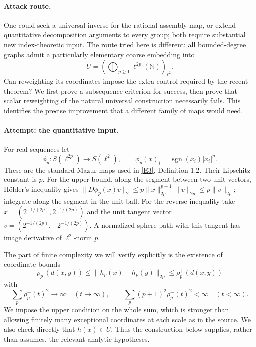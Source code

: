 \documentclass[11pt,a4paper]{article}
\newcommand{\N}{\mathbb{N}}
\newcommand{\eref}[2]{\hyperlink{extra:#1:#2}{[E#2]}}
\numberwithin{equation}{section}
\begin{document}
\paragraph{Attack route.}
One could seek a universal inverse for the rational assembly map, or extend quantitative decomposition arguments to every group; both require substantial new index-theoretic input. The route tried here is different: all bounded-degree graphs admit a particularly elementary coarse embedding into
\[
 U=\left(\bigoplus_{p\geq1}\ell^{2p}(\N)\right)_{\ell^2}.
\]
Can reweighting its coordinates impose the extra control required by the recent theorem? We first prove a subsequence criterion for success, then prove that scalar reweighting of the natural universal construction necessarily fails. This identifies the precise improvement that a different family of maps would need.

\paragraph{Attempt: the quantitative input.}
For real sequences let
\[
 \phi_p:S(\ell^{2p})\longrightarrow S(\ell^2),\qquad
 \phi_p(x)_i=\operatorname{sgn}(x_i)|x_i|^p.
\]
These are the standard Mazur maps used in \eref{statement}{3}, Definition 1.2. Their Lipschitz constant is $p$. For the upper bound, along the segment between two unit vectors, H\"older's inequality gives
$\|D\phi_p(x)v\|_2\leq p\|x\|_{2p}^{p-1}\|v\|_{2p}\leq p\|v\|_{2p}$; integrate along the segment in the unit ball. For the reverse inequality take
$x=(2^{-1/(2p)},2^{-1/(2p)})$ and the unit tangent vector
$v=(2^{-1/(2p)},-2^{-1/(2p)})$. A normalized sphere path with this tangent has image derivative of $\ell^2$-norm $p$.

The part of finite complexity we will verify explicitly is the existence of coordinate bounds
\begin{equation}\label{r56:bounds}
 \rho_p^-(d(x,y))\leq\|h_p(x)-h_p(y)\|_{2p}
                      \leq\rho_p^+(d(x,y))
\end{equation}
with
\begin{equation}\label{r56:complexity}
 \sum_p\rho_p^-(t)^2\longrightarrow\infty\quad(t\to\infty),
 \qquad
 \sum_p(p+1)^2\rho_p^+(t)^2<\infty\quad(t<\infty).
\end{equation}
We impose the upper condition on the whole sum, which is stronger than allowing finitely many exceptional coordinates at each scale as in the source. We also check directly that $h(x)\in U$. Thus the construction below supplies, rather than assumes, the relevant analytic hypotheses.
\end{document}
